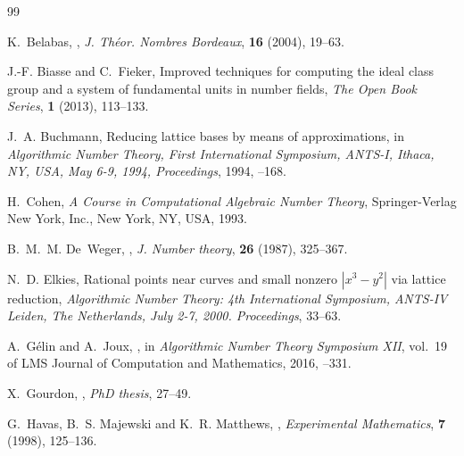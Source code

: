 \documentclass{amsart}
\theoremstyle{definition}
\begin{document}
\providecommand{\href}[2]{#2}
\providecommand{\arxiv}[1]{\href{http://arxiv.org/abs/#1}{arXiv:#1}}
\providecommand{\url}[1]{\texttt{#1}}
\providecommand{\urlprefix}{URL }
\begin{thebibliography}{99}

\newblock K.~Belabas,
,
\newblock \emph{J. Th\'eor. Nombres Bordeaux}, \textbf{16} (2004), 19--63.

\newblock J.-F. Biasse and C.~Fieker,
\newblock Improved techniques for computing the ideal class group and a system
  of fundamental units in number fields,
\newblock \emph{The Open Book Series}, \textbf{1} (2013), 113--133.

\newblock J.~A. Buchmann,
\newblock Reducing lattice bases by means of approximations,
\newblock in \emph{Algorithmic Number Theory, First International Symposium,
  ANTS-I, Ithaca, NY, USA, May 6-9, 1994, Proceedings}, 1994,
--168.

\newblock H.~Cohen,
\newblock \emph{A Course in Computational Algebraic Number Theory},
\newblock Springer-Verlag New York, Inc., New York, NY, USA, 1993.

\newblock B.~M.~M. De~Weger,
,
\newblock \emph{J. Number theory}, \textbf{26} (1987), 325--367.

\newblock N.~D. Elkies,
\newblock Rational points near curves and small nonzero $|x^3-y^2|$ via lattice
  reduction,
\newblock \emph{Algorithmic Number Theory: 4th International Symposium, ANTS-IV
  Leiden, The Netherlands, July 2-7, 2000. Proceedings}, 33--63.

\newblock A.~G{\'e}lin and A.~Joux,
,
\newblock in \emph{{Algorithmic Number Theory Symposium XII}}, vol.~19 of LMS
  Journal of Computation and Mathematics, 2016,
--331.

\newblock X.~Gourdon,
,
\newblock \emph{PhD thesis}, 27--49.

\newblock G.~Havas, B.~S. Majewski and K.~R. Matthews,
,
\newblock \emph{Experimental Mathematics}, \textbf{7} (1998), 125--136.


\end{thebibliography}
\end{document}

